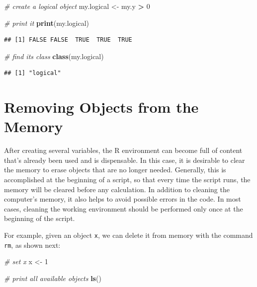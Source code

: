 \documentclass[11pt,]{book}
\newenvironment{Shaded}{\begin{snugshade}}{\end{snugshade}}
\newcommand{\KeywordTok}[1]{\textcolor[rgb]{0.27,0.27,0.27}{\textbf{#1}}}
\newcommand{\DecValTok}[1]{\textcolor[rgb]{0.06,0.06,0.06}{#1}}
\newcommand{\StringTok}[1]{\textcolor[rgb]{0.5,0.5,0.5}{#1}}
\newcommand{\CommentTok}[1]{\textcolor[rgb]{0.56,0.35,0.01}{\textit{#1}}}
\newcommand{\OperatorTok}[1]{\textcolor[rgb]{0.81,0.36,0.00}{\textbf{#1}}}
\newcommand{\NormalTok}[1]{#1}
\begin{document}
\begin{Shaded}
\begin{Highlighting}[]
\CommentTok{# create a logical object}
\NormalTok{my.logical <-}\StringTok{ }\NormalTok{my.y }\OperatorTok{>}\StringTok{ }\DecValTok{0}

\CommentTok{# print it }
\KeywordTok{print}\NormalTok{(my.logical) }
\end{Highlighting}
\end{Shaded}

\begin{verbatim}
## [1] FALSE FALSE  TRUE  TRUE  TRUE
\end{verbatim}

\begin{Shaded}
\begin{Highlighting}[]
\CommentTok{# find its class}
\KeywordTok{class}\NormalTok{(my.logical)}
\end{Highlighting}
\end{Shaded}

\begin{verbatim}
## [1] "logical"
\end{verbatim}

\section{Removing Objects from the
Memory}\label{removing-objects-from-the-memory}

After creating several variables, the R environment can become full of
content that's already been used and is dispensable. In this case, it is
desirable to clear the memory to erase objects that are no longer
needed. Generally, this is accomplished at the beginning of a script, so
that every time the script runs, the memory will be cleared before any
calculation. In addition to cleaning the computer's memory, it also
helps to avoid possible errors in the code. In most cases, cleaning the
working environment should be performed only once at the beginning of
the script.

For example, given an object \texttt{x}, we can delete it from memory
with the command \texttt{rm}, as shown next: 

\begin{Shaded}
\begin{Highlighting}[]
\CommentTok{# set x}
\NormalTok{x <-}\StringTok{ }\DecValTok{1}

\CommentTok{# print all available objects}
\KeywordTok{ls}\NormalTok{()}
\end{Highlighting}
\end{Shaded}
\end{document}
